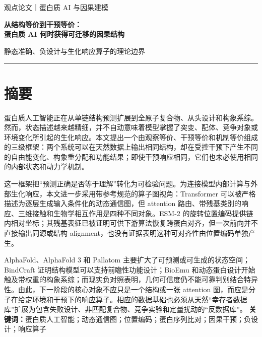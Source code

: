 \documentclass[10pt]{article}
\begin{document}
\hypersetup{pageanchor=false}
\begin{titlepage}
\vspace*{23mm}
{\color{muted}\large 观点论文｜蛋白质 AI 与因果建模\par}
\vspace{15mm}
{\color{ink}\bfseries\fontsize{25}{36}\selectfont
从结构等价到干预等价：\\[5mm]
蛋白质 AI 何时获得可迁移的因果结构\par}
\vspace{14mm}
{\Large 静态准确、负设计与生化响应算子的理论边界\par}
\vfill
{\color{ruleblue}\rule{30mm}{1.8pt}}
\end{titlepage}

\hypersetup{pageanchor=true}
\setcounter{page}{1}

\section*{摘要}

蛋白质人工智能正在从单链结构预测扩展到全原子复合物、从头设计和构象系综。然而，状态描述越来越精细，并不自动意味着模型掌握了突变、配体、竞争对象或环境变化所引起的生化响应。本文提出一个由观察等价、干预等价和机制等价组成的三级框架：两个系统可以在天然数据上输出相同结构，却在受控干预下产生不同的自由能变化、构象重分配和功能结果；即使干预响应相同，它们也未必使用相同的内部状态和动力学机制。

这一框架把“预测正确是否等于理解”转化为可检验问题。为连接模型内部计算与外部生化响应，本文进一步采用带参考规范的算子图视角：Transformer 可以被严格描述为逐层生成输入条件化的动态通信图，但 attention 路由、带残基类别的响应、三维接触和生物学相互作用是四种不同对象。ESM-2 的旋转位置编码提供链内相对坐标；其残基表征已被证明可供下游算法恢复跨蛋白对齐，但一次前向并不直接输出同源或结构 alignment，也没有证据表明这种可对齐性由位置编码单独产生。

AlphaFold、AlphaFold 3 和 Pallatom 主要扩大了可预测或可生成的状态空间；BindCraft 证明结构模型可以支持前瞻性功能设计；BioEmu 和动态蛋白设计开始触及带权重的构象系综；而现实负对照表明，几何可信度仍不能可靠判别结合特异性。由此，下一阶段的核心对象不应只是一个结构或一张 attention 图，而应是分子在给定环境和干预下的响应算子。相应的数据基础也必须从天然“幸存者数据库”扩展为包含失败设计、非匹配复合物、竞争实验和定量扰动的“反数据库”。
\noindent\textbf{关键词：}蛋白质人工智能；动态通信图；位置编码；蛋白序列比对；因果干预；负设计；响应算子
\end{document}
